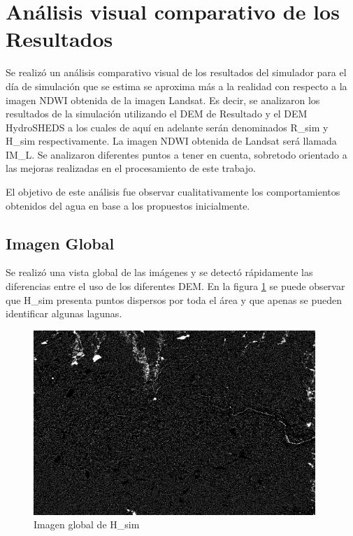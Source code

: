 \documentclass[10pt,a4paper, twoside]{report}
\begin{document}
\section{Análisis visual comparativo de los Resultados}
\label{analisisVisual}

Se realizó un análisis comparativo visual de los resultados del simulador para el día de simulación que se estima se aproxima más a la realidad con respecto a la imagen NDWI obtenida de la imagen Landsat. Es decir, se analizaron los resultados de la simulación utilizando el DEM de Resultado y el DEM HydroSHEDS a los cuales de aquí en adelante serán denominados R\_sim y H\_sim respectivamente. La imagen NDWI obtenida de Landsat será llamada IM\_L. Se analizaron diferentes puntos a tener en cuenta, sobretodo orientado a las mejoras realizadas en el procesamiento de este trabajo.

El objetivo de este análisis fue observar cualitativamente los comportamientos obtenidos del agua en base a los propuestos inicialmente.

\subsection{Imagen Global}

Se realizó una vista global de las imágenes y se detectó rápidamente las diferencias entre el uso de los diferentes DEM. En la figura \ref{HSHEDSGlobal} se puede observar que H\_sim presenta puntos dispersos por toda el área y que apenas se pueden identificar algunas lagunas.

\begin{figure}[!htb]
   \centering       
   \includegraphics[width=0.95\textwidth]{imagenes/HSHEDSGlobal.jpg}
 \caption{Imagen global de H\_sim}
 \label{HSHEDSGlobal}
\end{figure}
\end{document}
